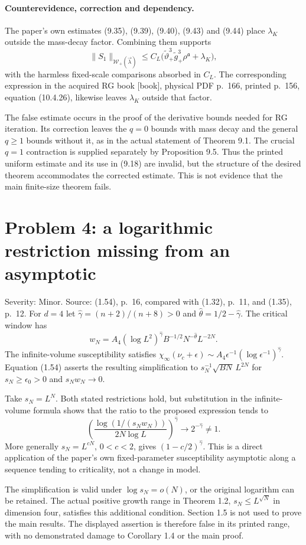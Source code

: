 \documentclass[10pt]{article}
\begin{document}
\paragraph*{Counterevidence, correction and dependency.}\mbox{}\par
The paper’s own estimates (9.35), (9.39), (9.40), (9.43) and (9.44) place \(\lambda_K\) outside the mass-decay factor. Combining them supports \[\|S_1\|_{\mathcal W_+(\vec\lambda)}
 \leq C_L\bigl(\widetilde\vartheta_+^3
                 \widetilde g_+^3\rho^{\mathfrak a}+\lambda_K\bigr),\] with the harmless fixed-scale comparisons absorbed in \(C_L\). The corresponding expression in the acquired RG book [book], physical PDF p. 166, printed p. 156, equation (10.4.26), likewise leaves \(\lambda_K\) outside that factor.\par
The false estimate occurs in the proof of the derivative bounds needed for RG iteration. Its correction leaves the \(q=0\) bounds with mass decay and the general \(q\geq1\) bounds without it, as in the actual statement of Theorem 9.1. The crucial \(q=1\) contraction is supplied separately by Proposition 9.5. Thus the printed uniform estimate and its use in (9.18) are invalid, but the structure of the desired theorem accommodates the corrected estimate. This is not evidence that the main finite-size theorem fails.\par
\section*{Problem 4: a logarithmic restriction missing from an asymptotic}
Severity: Minor. Source: (1.54), p. 16, compared with (1.32), p. 11, and (1.35), p. 12. For \(d=4\) let \(\widehat\gamma=(n+2)/(n+8)>0\) and \(\widehat\theta=1/2-\widehat\gamma\). The critical window has \[w_N=A_4(\log L^2)^{\widehat\gamma}B^{-1/2}
                N^{-\widehat\theta}L^{-2N}.\] The infinite-volume susceptibility satisfies \(\chi_\infty(\nu_c+\epsilon)\sim
 A_4\epsilon^{-1}(\log\epsilon^{-1})^{\widehat\gamma}\). Equation (1.54) asserts the resulting simplification to \(s_N^{-1}\sqrt{BN}\,L^{2N}\) for \(s_N\geq\epsilon_0>0\) and \(s_Nw_N\to0\).\par
Take \(s_N=L^N\). Both stated restrictions hold, but substitution in the infinite-volume formula shows that the ratio to the proposed expression tends to \[\left(\frac{\log(1/(s_Nw_N))}{2N\log L}\right)^{\widehat\gamma}
 \longrightarrow 2^{-\widehat\gamma}\neq1 .\] More generally \(s_N=L^{cN}\), \(0<c<2\), gives \((1-c/2)^{\widehat\gamma}\). This is a direct application of the paper’s own fixed-parameter susceptibility asymptotic along a sequence tending to criticality, not a change in model.\par
The simplification is valid under \(\log s_N=o(N)\), or the original logarithm can be retained. The actual positive growth range in Theorem 1.2, \(s_N\leq L^{\sqrt N}\) in dimension four, satisfies this additional condition. Section 1.5 is not used to prove the main results. The displayed assertion is therefore false in its printed range, with no demonstrated damage to Corollary 1.4 or the main proof.\par
\end{document}
